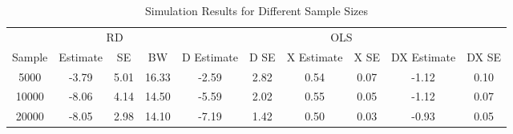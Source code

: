 \begin{table}

\caption{\label{tab:tab:sim_results}Simulation Results for Different Sample Sizes}
\centering
\begin{tabular}[t]{cccccccccc}
\toprule
\multicolumn{1}{c}{ } & \multicolumn{3}{c}{RD} & \multicolumn{6}{c}{OLS} \\
\cmidrule(l{3pt}r{3pt}){2-4} \cmidrule(l{3pt}r{3pt}){5-10}
Sample & Estimate & SE & BW & D Estimate & D SE & X Estimate & X SE & DX Estimate & DX SE\\
\midrule
5000 & -3.79 & 5.01 & 16.33 & -2.59 & 2.82 & 0.54 & 0.07 & -1.12 & 0.10\\
10000 & -8.06 & 4.14 & 14.50 & -5.59 & 2.02 & 0.55 & 0.05 & -1.12 & 0.07\\
20000 & -8.05 & 2.98 & 14.10 & -7.19 & 1.42 & 0.50 & 0.03 & -0.93 & 0.05\\
\bottomrule
\end{tabular}
\end{table}
